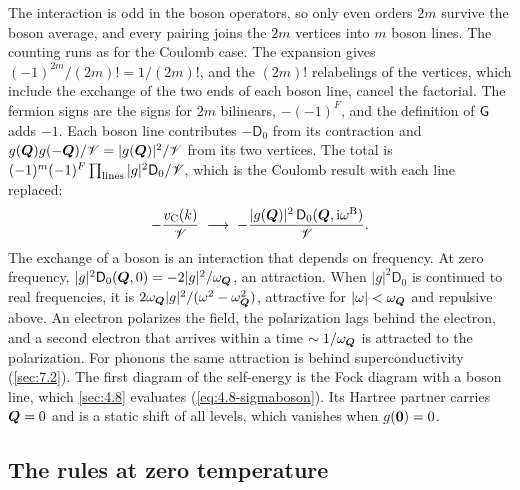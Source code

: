 The interaction is odd in the boson operators, so only even orders $2m$ survive the boson average, and every pairing joins the $2m$ vertices into $m$ boson lines. The counting runs as for the Coulomb case. The expansion gives $(-1)^{2m}/(2m)! = 1/(2m)!$, and the $(2m)!$ relabelings of the vertices, which include the exchange of the two ends of each boson line, cancel the factorial. The fermion signs are the signs for $2m$ bilinears, $-(-1)^F$, and the definition of $\mathsf{G}$ adds $-1$. Each boson line contributes $-\mathsf{D}_0$ from its contraction and $g(\bm{Q})g(-\bm{Q})/\mathscr{V} = |g(\bm{Q})|^2/\mathscr{V}$ from its two vertices. The total is $(-1)^m(-1)^F\prod_{\mathrm{lines}}|g|^2\mathsf{D}_0/\mathscr{V}$, which is the Coulomb result with each line replaced:
\begin{equation}
  -\frac{v_{\mathrm{C}}(k)}{\mathscr{V}} \;\longrightarrow\; -\frac{|g(\bm{Q})|^2\,\mathsf{D}_0(\bm{Q},\mathrm{i}\omega^{\mathrm{B}})}{\mathscr{V}} .
  \label{eq:D.11-boson}
\end{equation}
The exchange of a boson is an interaction that depends on frequency. At zero frequency, $|g|^2\mathsf{D}_0(\bm{Q},0) = -2|g|^2/\omega_{\bm{Q}}$, an attraction. When $|g|^2\mathsf{D}_0$ is continued to real frequencies, it is $2\omega_{\bm{Q}}|g|^2/(\omega^2 - \omega_{\bm{Q}}^2)$, attractive for $|\omega| < \omega_{\bm{Q}}$ and repulsive above. An electron polarizes the field, the polarization lags behind the electron, and a second electron that arrives within a time $\sim 1/\omega_{\bm{Q}}$ is attracted to the polarization. For phonons the same attraction is behind superconductivity (\cref{sec:7.2}). The first diagram of the self-energy is the Fock diagram with a boson line, which \cref{sec:4.8} evaluates (\cref{eq:4.8-sigmaboson}). Its Hartree partner carries $\bm{Q} = 0$ and is a static shift of all levels, which vanishes when $g(\bm{0}) = 0$.

\subsection*{The rules at zero temperature}

